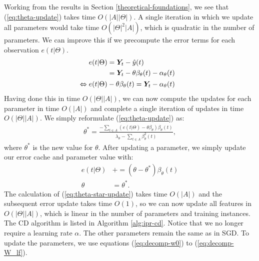 \documentclass[10pt]{proc}
\newcommand{\pluseq}{\mathrel{+}=}
\begin{document}
Working from the results in Section \ref{theoretical-foundations}, we see that
(\ref{eq:theta-update}) takes time $O(|A||\Theta|)$. A single iteration in
which we update all parameters would take time $O(|\Theta|^2|A|)$, which is
quadratic in the number of parameters. We can improve this if we precompute the
error terms for each observation $e(t | \Theta)$.
%
\begin{align}
    & \hphantom{==} \begin{aligned}[t]
        e(t | \Theta)
            &= \bm{Y}_t - \hat{y}(t)  \\
            &= \bm{Y}_t - \theta\beta_\theta(t) - \alpha_\theta(t)
    \end{aligned} \\
    & \Leftrightarrow \begin{aligned}[t]
        e(t | \Theta) - \theta\beta_\theta(t)
            &= \bm{Y}_t - \alpha_\theta(t)
    \end{aligned}
\end{align}
%
Having done this in time $O(|\Theta||A|)$, we can now compute the updates for
each parameter in time $O(|A|)$ and complete a single iteration of updates in
time $O(|\Theta||A|)$. We simply reformulate (\ref{eq:theta-update}) as:
%
\begin{align} \label{eq:theta-star-update}
    \theta^* =
    \frac{-\sum_{t \in A} (e(t | \Theta) - \theta\beta_\theta) \beta_\theta(t)}
         {\lambda_\theta - \sum_{t \in A} \beta_\theta^2(t)},
\end{align}
%
where $\theta^*$ is the new value for $\theta$. After updating a parameter, we
simply update our error cache and parameter value with:
%
\begin{align}
    e(t | \Theta) &\pluseq (\theta - \theta^*) \beta_\theta(t) \\
    \theta &= \theta^*.
\end{align}
%
The calculation of (\ref{eq:theta-star-update}) takes time $O(|A|)$ and the
subsequent error update takes time $O(1)$, so we can now update all features in
$O(|\Theta||A|)$, which is linear in the number of parameters and training
instances. The CD algorithm is listed in Algorithm \ref{alg:ipr-cd}. Notice that
we no longer require a learning rate $\alpha$. The other parameters remain the
same as in SGD. To update the parameters, we use equations
(\ref{eq:decomp-w0}) to (\ref{eq:decomp-W_lf}).
\end{document}
